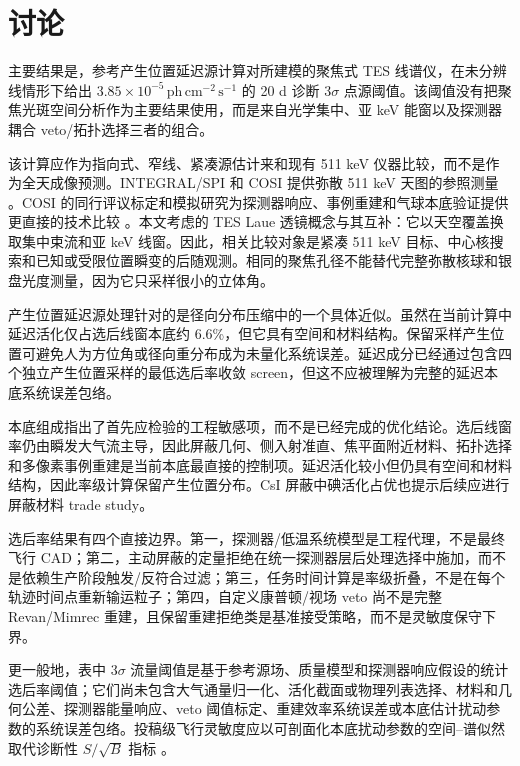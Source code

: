 \documentclass[preprint,12pt]{elsarticle}
\newcommand{\phcms}{\,\mathrm{ph\,cm^{-2}\,s^{-1}}}
\begin{document}
\section{讨论}
\label{sec:discussion}

主要结果是，参考产生位置延迟源计算对所建模的聚焦式 TES 线谱仪，在未分辨线情形下给出 $3.85\times10^{-5}\phcms$ 的 20 d 诊断 $3\sigma$ 点源阈值。该阈值没有把聚焦光斑空间分析作为主要结果使用，而是来自光学集中、亚 keV 能窗以及探测器耦合 veto/拓扑选择三者的组合。

该计算应作为指向式、窄线、紧凑源估计来和现有 511 keV 仪器比较，而不是作为全天成像预测。INTEGRAL/SPI 和 COSI 提供弥散 511 keV 天图的参照测量 \cite{Siegert2016AA,Kierans2020,Siegert2020COSI,Yoneda2025}。COSI 的同行评议标定和模拟研究为探测器响应、事例重建和气球本底验证提供更直接的技术比较 \cite{Beechert2022,Sleator2019,Gallego2025Balloon,Ciabattoni2025ACS}。本文考虑的 TES Laue 透镜概念与其互补：它以天空覆盖换取集中束流和亚 keV 线窗。因此，相关比较对象是紧凑 511 keV 目标、中心核搜索和已知或受限位置瞬变的后随观测。相同的聚焦孔径不能替代完整弥散核球和银盘光度测量，因为它只采样很小的立体角。

产生位置延迟源处理针对的是径向分布压缩中的一个具体近似。虽然在当前计算中延迟活化仅占选后线窗本底约 6.6\%，但它具有空间和材料结构。保留采样产生位置可避免人为方位角或径向重分布成为未量化系统误差。延迟成分已经通过包含四个独立产生位置采样的最低选后率收敛 screen，但这不应被理解为完整的延迟本底系统误差包络。

本底组成指出了首先应检验的工程敏感项，而不是已经完成的优化结论。选后线窗率仍由瞬发大气流主导，因此屏蔽几何、侧入射准直、焦平面附近材料、拓扑选择和多像素事例重建是当前本底最直接的控制项。延迟活化较小但仍具有空间和材料结构，因此率级计算保留产生位置分布。CsI 屏蔽中碘活化占优也提示后续应进行屏蔽材料 trade study。

选后率结果有四个直接边界。第一，探测器/低温系统模型是工程代理，不是最终飞行 CAD；第二，主动屏蔽的定量拒绝在统一探测器层后处理选择中施加，而不是依赖生产阶段触发/反符合过滤；第三，任务时间计算是率级折叠，不是在每个轨迹时间点重新输运粒子；第四，自定义康普顿/视场 veto 尚不是完整 Revan/Mimrec 重建，且保留重建拒绝类是基准接受策略，而不是灵敏度保守下界。

更一般地，表中 $3\sigma$ 流量阈值是基于参考源场、质量模型和探测器响应假设的统计选后率阈值；它们尚未包含大气通量归一化、活化截面或物理列表选择、材料和几何公差、探测器能量响应、veto 阈值标定、重建效率系统误差或本底估计扰动参数的系统误差包络。投稿级飞行灵敏度应以可剖面化本底扰动参数的空间--谱似然取代诊断性 $S/\sqrt{B}$ 指标 \cite{Cowan2011}。
\end{document}
